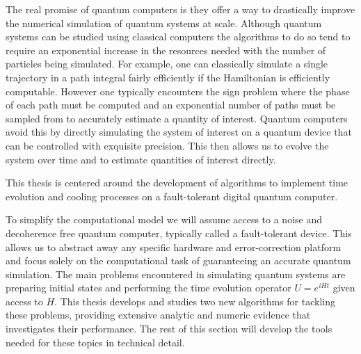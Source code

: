 The real promise of quantum computers is they offer a way to drastically improve the numerical simulation of quantum systems at scale. Although quantum systems can be studied using classical computers the algorithms to do so tend to require an exponential increase in the resources needed with the number of particles being simulated. For example, one can classically simulate a single trajectory in a path integral fairly efficiently if the Hamiltonian is efficiently computable. However one typically encounters the sign problem where the phase of each path must be computed and an exponential number of paths must be sampled from to accurately estimate a quantity of interest. Quantum computers avoid this by directly simulating the system of interest on a quantum device that can be controlled with exquisite precision. This then allows us to evolve the system over time and to estimate quantities of interest directly. 

This thesis is centered around the development of algorithms to implement time evolution and cooling processes on a fault-tolerant digital quantum computer. 

To simplify the computational model we will assume access to a noise and decoherence free quantum computer, typically called a fault-tolerant device. This allows us to abstract away any specific hardware and error-correction platform and focus solely on the computational task of guaranteeing an accurate quantum simulation. The main problems encountered in simulating quantum systems are preparing initial states and performing the time evolution operator $U = e^{i H t}$ given access to $H$. This thesis develops and studies two new algorithms for tackling these problems, providing extensive analytic and numeric evidence that investigates their performance. The rest of this section will develop the tools needed for these topics in technical detail. 